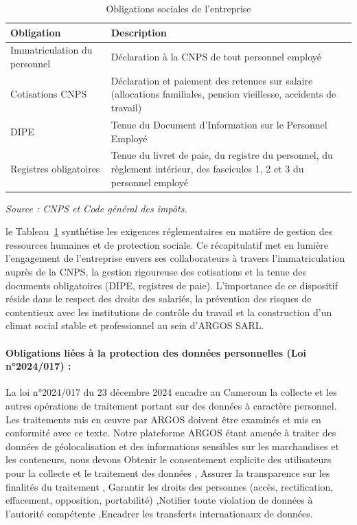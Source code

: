 \bigskip

\begin{table}[htbp]
    \centering
    \caption{Obligations sociales de l'entreprise}
    \label{tab:obligations_sociales}
    \renewcommand{\arraystretch}{1.5}
    \begin{tabularx}{\textwidth}{|>{\raggedright\arraybackslash}p{4cm}|X|}
        \hline
        \textbf{Obligation} & \textbf{Description} \\
        \hline
        Immatriculation du personnel & Déclaration à la CNPS de tout personnel employé \\
        \hline
        Cotisations CNPS & Déclaration et paiement des retenues sur salaire (allocations familiales, pension vieillesse, accidents de travail) \\
        \hline
        DIPE & Tenue du Document d'Information sur le Personnel Employé \\
        \hline
        Registres obligatoires & Tenue du livret de paie, du registre du personnel, du règlement intérieur, des fascicules 1, 2 et 3 du personnel employé \\
        \hline
    \end{tabularx}
    \noindent\textit{Source : CNPS et Code général des impôts\cite{cnps_employeurs,cgi_cameroun}.}
\end{table}

\noindent le Tableau~\ref{tab:obligations_sociales} synthétise les exigences réglementaires en matière de gestion des ressources humaines et de protection sociale. Ce récapitulatif met en lumière l'engagement de l'entreprise envers ses collaborateurs à travers l'immatriculation auprès de la CNPS, la gestion rigoureuse des cotisations et la tenue des documents obligatoires (DIPE, registres de paie). L'importance de ce dispositif réside dans le respect des droits des salariés, la prévention des risques de contentieux avec les institutions de contrôle du travail et la construction d'un climat social stable et professionnel au sein d'ARGOS SARL.

\paragraph{Obligations liées à la protection des données personnelles (Loi n°2024/017) :}
La loi n°2024/017 du 23 décembre 2024 encadre au Cameroun la collecte et les autres opérations de traitement portant sur des données à caractère personnel. Les traitements mis en œuvre par ARGOS doivent être examinés et mis en conformité avec ce texte\cite{loi2024_donnees}.
Notre plateforme ARGOS étant amenée à traiter des données de géolocalisation et des informations sensibles sur les marchandises et les conteneurs, nous devons Obtenir le consentement explicite des utilisateurs pour la collecte et le traitement des données , Assurer la transparence sur les finalités du traitement , Garantir les droits des personnes (accès, rectification, effacement, opposition, portabilité) ,Notifier toute violation de données à l'autorité compétente ,Encadrer les transferts internationaux de données.

